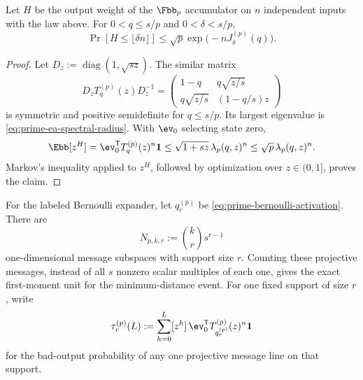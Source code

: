 \begin{lemma}
\label{lem:prime-ea-spectral-tail}
Let $H$ be the output weight of the $\Fbb_p$ accumulator on $n$ independent
inputs with the law above.  For $0<q\leq s/p$ and
$0<\delta<s/p$,
\begin{equation}
 \Pr[H\leq\lfloor\delta n\rfloor]
 \leq\sqrt p\exp\bigl(-nJ^{(p)}_\delta(q)\bigr).
 \label{eq:prime-ea-spectral-tail}
\end{equation}
\end{lemma}

\begin{proof}
Let $D_z:=\operatorname{diag}(1,\sqrt{sz})$.  The similar matrix
\[
 D_zT^{(p)}_q(z)D_z^{-1}
 =\begin{pmatrix}
   1-q&q\sqrt{z/s}\\
   q\sqrt{z/s}&(1-q/s)z
  \end{pmatrix}
\]
is symmetric and positive semidefinite for $q\leq s/p$.  Its largest
eigenvalue is \eqref{eq:prime-ea-spectral-radius}.  With $\ev_0$ selecting
state zero,
\[
 \Ebb[z^H]
 =\ev_0^{\mathsf T}T^{(p)}_q(z)^n\boldsymbol 1
 \leq\sqrt{1+sz}\,\lambda_p(q,z)^n
 \leq\sqrt p\,\lambda_p(q,z)^n.
\]
Markov's inequality applied to $z^H$, followed by optimization over
$z\in(0,1]$, proves the claim.
\end{proof}

For the labeled Bernoulli expander, let $q^{(p)}_r$ be
\eqref{eq:prime-bernoulli-activation}.  There are
\begin{equation}
 N_{p,k,r}:=\binom{k}{r}s^{r-1}
 \label{eq:prime-projective-support-count}
\end{equation}
one-dimensional message subspaces with support size $r$.  Counting these
projective messages, instead of all $s$ nonzero scalar multiples of each one,
gives the exact first-moment unit for the minimum-distance event.
For one fixed support of size $r$, write
\begin{equation}
 \tau^{(p)}_r(L)
 :=\sum_{h=0}^L[z^h]\,
   \ev_0^{\mathsf T}T^{(p)}_{q^{(p)}_r}(z)^n\boldsymbol 1
 \label{eq:prime-ea-line-tail}
\end{equation}
for the bad-output probability of any one projective message line on that
support.

